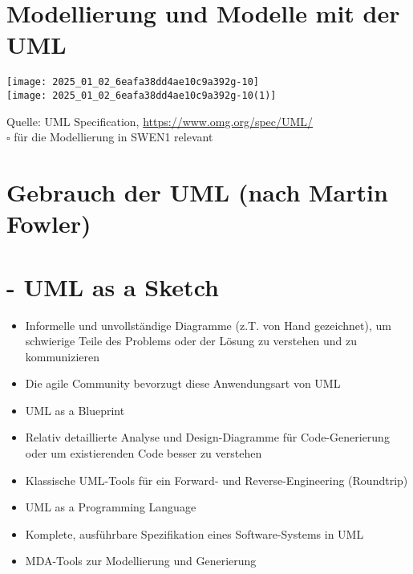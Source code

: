 \section*{Modellierung und Modelle mit der UML}
\texttt{[image: 2025\_01\_02\_6eafa38dd4ae10c9a392g-10]}\\
\texttt{[image: 2025\_01\_02\_6eafa38dd4ae10c9a392g-10(1)]}

Quelle: UML Specification, \href{https://www.omg.org/spec/UML/}{https://www.omg.org/spec/UML/}\\
$\square$ für die Modellierung in SWEN1 relevant

\section*{Gebrauch der UML (nach Martin Fowler)}
\section*{- UML as a Sketch}
\begin{itemize}
  \item Informelle und unvollständige Diagramme (z.T. von Hand gezeichnet), um schwierige Teile des Problems oder der Lösung zu verstehen und zu kommunizieren
  \item Die agile Community bevorzugt diese Anwendungsart von UML
  \item UML as a Blueprint
  \item Relativ detaillierte Analyse und Design-Diagramme für Code-Generierung oder um existierenden Code besser zu verstehen
  \item Klassische UML-Tools für ein Forward- und Reverse-Engineering (Roundtrip)
  \item UML as a Programming Language
  \item Komplete, ausführbare Spezifikation eines Software-Systems in UML
  \item MDA-Tools zur Modellierung und Generierung
\end{itemize}

